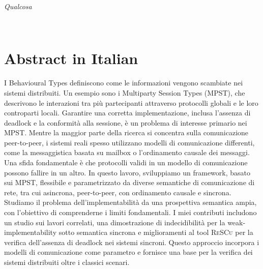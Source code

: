 \documentclass[12pt,a4paper,twoside]{book}
\theoremstyle{definition}
\theoremstyle{definition}
\theoremstyle{definition}
\begin{document}

\thispagestyle{plain}
\restoregeometry
\topmargin=6.5cm
\begin{flushright}
\emph{
\LARGE{Qualcosa}%
}
\end{flushright}

\newpage~\thispagestyle{plain}~\newpage

{}
\chapter*{Abstract in Italian}
I Behavioural Types definiscono come le informazioni vengono scambiate nei
sistemi distribuiti. Un esempio sono i Multiparty Session Types (MPST),
che descrivono le interazioni tra più partecipanti attraverso protocolli globali
e le loro controparti locali. Garantire una corretta implementazione, inclusa
l’assenza di deadlock e la conformità alla sessione, è un problema di interesse
primario nei MPST.  
Mentre la maggior parte della ricerca si concentra sulla comunicazione
peer-to-peer, i sistemi reali spesso utilizzano modelli di comunicazione
differenti, come la messaggistica basata su mailbox o l’ordinamento
causale dei messaggi. Una sfida fondamentale è che protocolli validi in un
modello di comunicazione possono fallire in un altro.  
In questo lavoro, sviluppiamo un framework, basato sui MPST,
flessibile e parametrizzato da diverse
semantiche di comunicazione di rete, tra cui asincrona, peer-to-peer, con ordinamento
causale e sincrona. Studiamo il problema dell’implementabilità da una
prospettiva semantica ampia, con l’obiettivo di comprenderne i limiti
fondamentali. I miei contributi includono un studio sui lavori correlati, una
dimostrazione di indecidibilità per la weak-implementability sotto semantica
sincrona e miglioramenti al tool \textsc{ReSCu} per la verifica
dell’assenza di deadlock nei sistemi sincroni.  
Questo approccio incorpora i modelli di comunicazione come parametro e fornisce
una base per la verifica dei sistemi distribuiti oltre i classici scenari. 
\thispagestyle{plain}
\topmargin=-1cm
\cleardoublepage

{}
\end{document}
